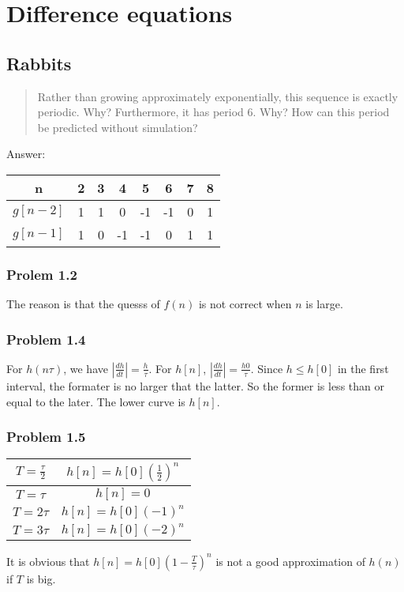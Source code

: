 \documentclass{book}
\begin{document}
\chapter{Difference equations}

\section{Rabbits}

\begin{quote}
  Rather than growing approximately exponentially, this sequence is exactly periodic. Why? Furthermore, it has period 6.
  Why? How can this period be predicted without simulation?
\end{quote}

Answer:
\begin{center}
\begin{tabular}{ |c|c|c|c|c|c|c|c| } 
 \hline
     n & 2 & 3 & 4  & 5  & 6  & 7 & 8 \\
\hline \hline
  $g[n-2]$ & 1 & 1 & 0  & -1 & -1 & 0 & 1 \\ 
  \hline
  $g[n-1]$ & 1 & 0 & -1 & -1 & 0  & 1 & 1 \\ 
 \hline
\end{tabular}
\end{center}

\subsection*{Prolem 1.2}
The reason is that the quesss of $f(n)$ is not correct when $n$ is large.

\subsection*{Problem 1.4}
For $h(n\tau)$, we have $|\frac{dh}{dt}| = \frac{h}{\tau}$. For $h[n]$, $|\frac{dh}{dt}|=\frac{h{0}}{\tau}$. Since $h \le h[0]$ in the first interval, the
formater is no larger that the latter. So the former is less than or equal to the later. The lower curve is $h[n]$.

\subsection*{Problem 1.5}
\begin{center}
  \begin{tabular}{|c|c|}
    \hline
    $T = \frac{\tau}{2}$ & $h[n]=h[0](\frac{1}{2})^n$ \\
    \hline
    $T = \tau$ & $h[n] = 0$ \\
    \hline
    $T = 2\tau$ & $h[n] = h[0](-1)^n$ \\
    \hline
    $T = 3\tau$ & $h[n] = h[0](-2)^n$ \\
    \hline
  \end{tabular}
\end{center}
It is obvious that $h[n] = h[0](1-\frac{T}{\tau})^n$ is not a good approximation of $h(n)$ if $T$ is big.
\end{document}
